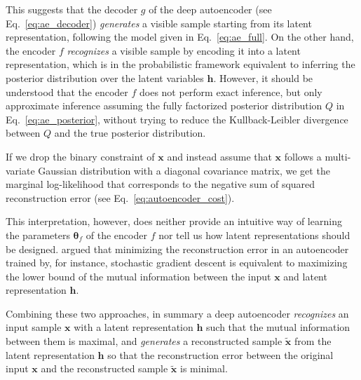 \documentclass{now}
\newcommand{\vect}[1]{\mathbf{#1}}
\newcommand{\vects}[1]{\boldsymbol{#1}}
\newcommand{\vh}[0]{\vect{h}}
\newcommand{\vx}[0]{\vect{x}}
\newcommand{\TT}[0]{{\vects{\theta}}}
\begin{document}
This suggests that the decoder $g$ of the deep autoencoder
(see Eq.~\eqref{eq:ae_decoder}) \textit{generates} a visible
sample starting from its latent representation, following
the model given in Eq.~\eqref{eq:ae_full}. On the other
hand, the encoder $f$ \textit{recognizes} a visible sample
by encoding it into a latent representation, which is in the
probabilistic framework equivalent to inferring the
posterior distribution over the latent variables $\vh$.
However, it should be understood that the encoder $f$ does
not perform exact inference, but only approximate inference
assuming the fully factorized posterior distribution $Q$ in
Eq.~\eqref{eq:ae_posterior}, without trying to reduce
the Kullback-Leibler divergence between $Q$ and the true
posterior distribution.

If we drop the binary constraint of $\vx$ and instead assume
that $\vx$ follows a multi-variate Gaussian distribution
with a diagonal covariance matrix, we get the marginal
log-likelihood that corresponds to the negative sum of
squared reconstruction error (see
Eq.~\eqref{eq:autoencoder_cost}).

This interpretation, however, does neither provide an intuitive
way of learning the parameters $\TT_f$ of the encoder $f$ nor
tell us how latent representations should be designed.
\citet{Vincent2010} argued that minimizing the reconstruction
error in an autoencoder trained by, for instance, stochastic
gradient descent is equivalent to maximizing the lower bound of
the mutual information between the input $\vx$ and latent
representation $\vh$. 

Combining these two approaches, in summary a deep
autoencoder \textit{recognizes} an input sample $\vx$ with a
latent representation $\vh$ such that the mutual information
between them is maximal, and \textit{generates} a
reconstructed sample $\tilde{\vx}$ from the latent
representation $\vh$ so that the reconstruction error
between the original input $\vx$ and the reconstructed
sample $\tilde{\vx}$ is minimal.

\end{document}

